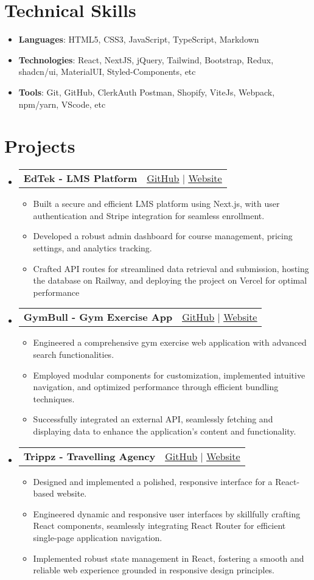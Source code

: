 \documentclass[letterpaper,11pt]{article}
\makeatletter
\newcommand{\resumeItem}[1]{
  \item\small{
    {#1 \vspace{-2pt}}
  }
}
\newcommand{\resumeProjectHeading}[2]{
    \item
    \begin{tabular*}{0.97\textwidth}{l@{\extracolsep{\fill}}r}
      \small#1 & #2 \\
    \end{tabular*}\vspace{-7pt}
}
\newcommand{\resumeSubHeadingListStart}{\begin{itemize}[leftmargin=0.15in, label={}]}
\newcommand{\resumeSubHeadingListEnd}{\end{itemize}}
\newcommand{\resumeItemListStart}{\begin{itemize}}
\newcommand{\resumeItemListEnd}{\end{itemize}\vspace{-5pt}}
\makeatother
\begin{document}
%
\section{Technical Skills}
\resumeItemListStart
            \resumeItem{\textbf{Languages}{: HTML5, CSS3, JavaScript, TypeScript, Markdown}}
            \resumeItem{\textbf{Technologies}{: React, NextJS, jQuery, Tailwind, Bootstrap, Redux, shadcn/ui, MaterialUI, Styled-Components, etc}}
            \resumeItem{\textbf{Tools}{: Git, GitHub, ClerkAuth Postman, Shopify, ViteJs, Webpack, npm/yarn, VScode, etc}}
\resumeItemListEnd


\section{Projects}
    \resumeSubHeadingListStart
    \resumeProjectHeading
          {\textbf{EdTek - LMS Platform}}
          {{ {\small {\faGithub} \href{https://github.com/dushmanta05/edtek}{\underline{GitHub}}} $|$ {\small {\faGlobe} \href{https://edtek.vercel.app/}{{\underline{Website}}}}}}
          \resumeItemListStart
            \resumeItem{Built a secure and efficient LMS platform using Next.js, with user authentication and Stripe integration for seamless enrollment.}
            \resumeItem{Developed a robust admin dashboard for course management, pricing settings, and analytics tracking.}
            \resumeItem{Crafted API routes for streamlined data retrieval and submission, hosting the database on Railway, and deploying the project on Vercel for optimal performance}
          \resumeItemListEnd
        \resumeProjectHeading
          {\textbf{GymBull - Gym Exercise App}}
          {{ {\small {\faGithub} \href{https://github.com/dushmanta05/gymbull}{\underline{GitHub}}} $|$ {\small {\faGlobe} \href{https://fit-bull.netlify.app/}{{\underline{Website}}}}}}
          \resumeItemListStart
            \resumeItem{Engineered a comprehensive gym exercise web application with advanced search functionalities.}
            \resumeItem{Employed modular components for customization, implemented intuitive navigation, and optimized performance through efficient bundling techniques.}
            \resumeItem{Successfully integrated an external API, seamlessly fetching and displaying data to enhance the application's content and functionality.}
          \resumeItemListEnd
      \resumeProjectHeading
          {\textbf{Trippz - Travelling Agency}}
          {{ {\small {\faGithub} \href{https://github.com/dushmanta05/trippz}{\underline{GitHub}}} $|$ {\small {\faGlobe} \href{https://trippz.vercel.app/}{{\underline{Website}}}}}}
          \resumeItemListStart
            \resumeItem{Designed and implemented a polished, responsive interface for a React-based website.}
            \resumeItem{Engineered dynamic and responsive user interfaces by skillfully crafting React components, seamlessly integrating React Router for efficient single-page application navigation.}
            \resumeItem{Implemented robust state management in React, fostering a smooth and reliable web experience grounded in responsive design principles.}
          \resumeItemListEnd
    \resumeSubHeadingListEnd
\end{document}
